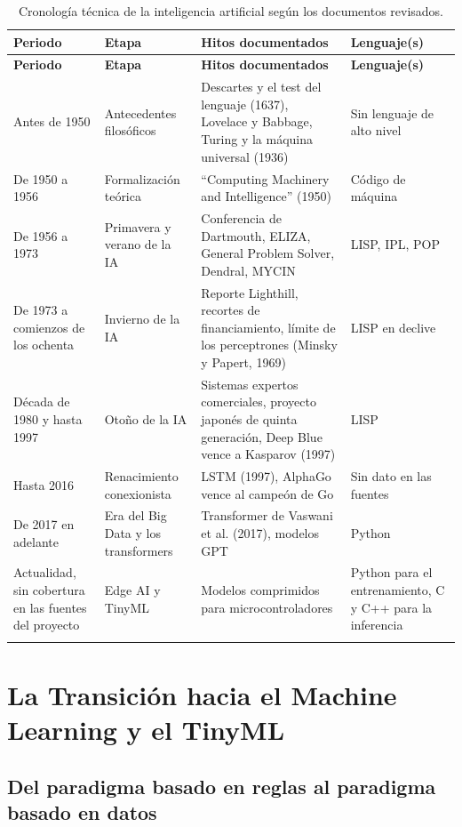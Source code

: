 \documentclass[12pt,letterpaper]{article}
\begin{document}
\begin{longtable}{p{2.7cm} p{3.4cm} p{5.2cm} p{2.4cm}}
\toprule
\textbf{Periodo} & \textbf{Etapa} & \textbf{Hitos documentados} & \textbf{Lenguaje(s)} \\
\midrule
\endfirsthead
\toprule
\textbf{Periodo} & \textbf{Etapa} & \textbf{Hitos documentados} & \textbf{Lenguaje(s)} \\
\midrule
\endhead
Antes de 1950 & Antecedentes filos\'oficos & Descartes y el test del lenguaje (1637), Lovelace y Babbage, Turing y la m\'aquina universal (1936) & Sin lenguaje de alto nivel \\
De 1950 a 1956 & Formalizaci\'on te\'orica & ``Computing Machinery and Intelligence'' (1950) & C\'odigo de m\'aquina \\
De 1956 a 1973 & Primavera y verano de la IA & Conferencia de Dartmouth, ELIZA, General Problem Solver, Dendral, MYCIN & LISP, IPL, POP \\
De 1973 a comienzos de los ochenta & Invierno de la IA & Reporte Lighthill, recortes de financiamiento, l\'imite de los perceptrones (Minsky y Papert, 1969) & LISP en declive \\
D\'ecada de 1980 y hasta 1997 & Oto\~no de la IA & Sistemas expertos comerciales, proyecto japon\'es de quinta generaci\'on, Deep Blue vence a Kasparov (1997) & LISP \\
Hasta 2016 & Renacimiento conexionista & LSTM (1997), AlphaGo vence al campe\'on de Go & Sin dato en las fuentes \\
De 2017 en adelante & Era del Big Data y los transformers & Transformer de Vaswani et al. (2017), modelos GPT & Python \\
Actualidad, sin cobertura en las fuentes del proyecto & Edge AI y TinyML & Modelos comprimidos para microcontroladores & Python para el entrenamiento, C y C++ para la inferencia \\
\bottomrule
\caption{Cronolog\'ia t\'ecnica de la inteligencia artificial seg\'un los documentos revisados.}
\label{tab:cronologia}
\end{longtable}

\section{La Transici\'on hacia el Machine Learning y el TinyML}

\subsection{Del paradigma basado en reglas al paradigma basado en datos}
\end{document}
